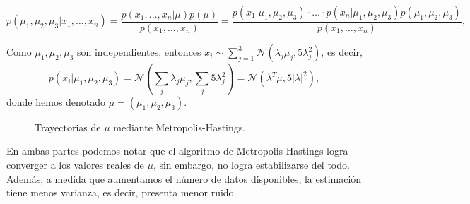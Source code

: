 \documentclass[
	spanish, %
	letterpaper, oneside
]{article}
\begin{document}
$$p(\mu_1,\mu_2,\mu_3|x_1,\ldots,x_n)=\frac{p(x_1,\ldots,x_n|\mu)p(\mu)}{p(x_1,\ldots,x_n)}=\frac{p(x_1|\mu_1,\mu_2,\mu_3)\cdot\ldots\cdot p(x_n|\mu_1,\mu_2,\mu_3)p(\mu_1,\mu_2,\mu_3)}{p(x_1,\ldots,x_n)},$$

Como $\mu_1,\mu_2,\mu_3$ son independientes, entonces $x_i\sim\sum_{j=1}^3\mathcal N(\lambda_j\mu_j,5\lambda_j^2)$, es decir, $$p(x_i|\mu_1,\mu_2,\mu_3)=\mathcal N(\sum_j\lambda_j\mu_j,\sum_j5\lambda_j^2)=\mathcal N(\lambda^T\mu,5|\lambda|^2),$$
donde hemos denotado \(\mu=(\mu_1,\mu_2,\mu_3)\).

\begin{figure}[H]
	\caption{Trayectorias de \(\mu\) mediante Metropolis-Hastings.}
\end{figure}

En ambas partes podemos notar que el algoritmo de Metropolis-Hastings logra converger a los valores reales de \(\mu\), sin embargo, no logra estabilizarse del todo. Además, a medida que aumentamos el número de datos disponibles, la estimación tiene menos varianza, es decir, presenta menor ruido.

\end{document}
